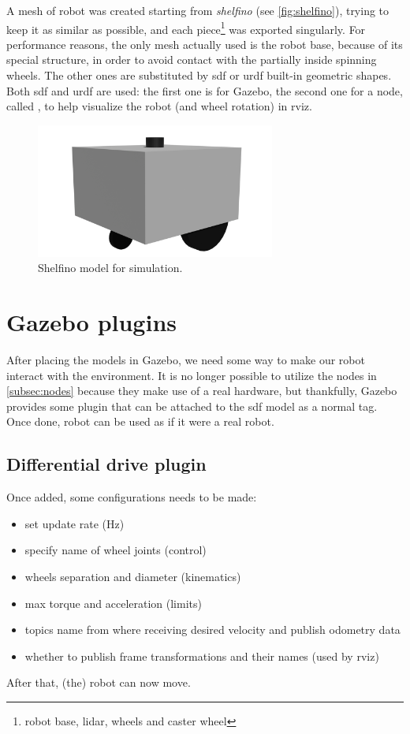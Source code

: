 A mesh of robot was created starting from {\it shelfino} (see \autoref{fig:shelfino}), trying to keep it as similar as possible, and each piece\footnote{robot base, lidar, wheels and caster wheel} was exported singularly. For performance reasons, the only mesh actually used is the robot base, because of its special structure, in order to avoid contact with the partially inside spinning wheels. The other ones are substituted by \acrshort{sdf} or \acrfull{urdf} built-in geometric shapes.
Both \acrshort{sdf} and \acrshort{urdf} are used: the first one is for Gazebo, the second one for a node, called , to help visualize the robot (and wheel rotation) in \acrshort{rviz}.

\begin{figure}[h]
    \centering
    \includegraphics[width=0.7\textwidth]{images/shelfino_3d.png}
    \caption{Shelfino model for simulation.}
\end{figure}

\section{Gazebo plugins}

After placing the models in Gazebo, we need some way to make our robot interact with the environment. It is no longer possible to utilize the nodes in \autoref{subsec:nodes} because they make use of a real hardware, but thankfully, Gazebo provides some plugin that can be attached to the \acrshort{sdf} model as a normal tag. Once done, robot can be used as if it were a real robot.

\subsection{Differential drive plugin}

Once added, some configurations needs to be made:
\begin{itemize}
    \item set update rate (Hz)
    \item specify name of wheel joints (control)
    \item wheels separation and diameter (kinematics)
    \item max torque and acceleration (limits)
    \item topics name from where receiving desired velocity and publish odometry data
    \item whether to publish frame transformations and their names (used by \acrshort{rviz})
\end{itemize}
After that, (the) robot can now move.

